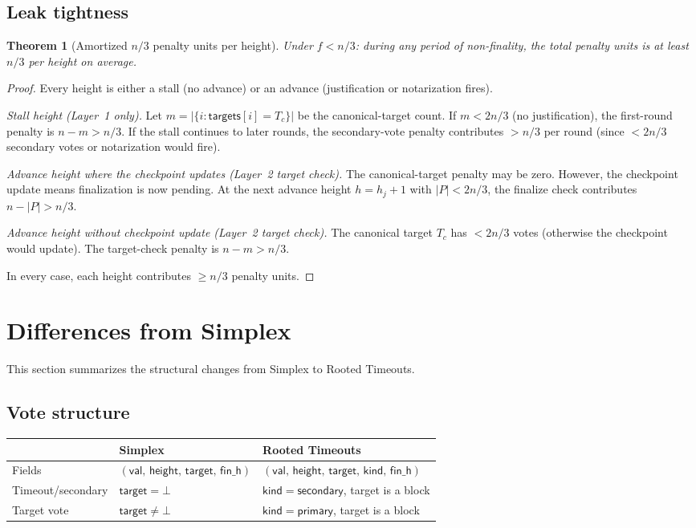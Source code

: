 \ifx\litemode\undefined\documentclass{article}\fi
\theoremstyle{plain}
\newtheorem{theorem}{Theorem}
\theoremstyle{definition}
\theoremstyle{remark}
\begin{document}
\subsection{Leak tightness}

\begin{theorem}[Amortized $n/3$ penalty units per height]\label{thm:tightness}
Under $f < n/3$: during any period of non-finality, the total penalty units is at least $n/3$ per height on average.
\end{theorem}

\begin{proof}
Every height is either a stall (no advance) or an advance (justification or notarization fires).

\emph{Stall height (Layer~1 only).}
Let $m = |\{i : \mathsf{targets}[i] = T_c\}|$ be the canonical-target count.
If $m < 2n/3$ (no justification), the first-round penalty is $n - m > n/3$.
If the stall continues to later rounds, the secondary-vote penalty contributes $> n/3$ per round (since $< 2n/3$ secondary votes or notarization would fire).

\emph{Advance height where the checkpoint updates (Layer~2 target check).}
The canonical-target penalty may be zero.
However, the checkpoint update means finalization is now pending.
At the next advance height $h = h_j + 1$ with $|P| < 2n/3$, the finalize check contributes $n - |P| > n/3$.

\emph{Advance height without checkpoint update (Layer~2 target check).}
The canonical target $T_c$ has $< 2n/3$ votes (otherwise the checkpoint would update).
The target-check penalty is $n - m > n/3$.

In every case, each height contributes $\geq n/3$ penalty units.
\end{proof}

\appendix
\section{Differences from Simplex}\label{app:diffs}

This section summarizes the structural changes from Simplex to Rooted Timeouts.

\subsection*{Vote structure}

\begin{center}
\begin{tabularx}{\textwidth}{lXX}
\toprule
& \textbf{Simplex} & \textbf{Rooted Timeouts} \\
\midrule
Fields & $(\mathsf{val},\, \mathsf{height},\, \mathsf{target},\, \mathsf{fin\_h})$ & $(\mathsf{val},\, \mathsf{height},\, \mathsf{target},\, \mathsf{kind},\, \mathsf{fin\_h})$ \\
Timeout/secondary & $\mathsf{target} = \bot$ & $\mathsf{kind} = \mathsf{secondary}$, target is a block \\
Target vote & $\mathsf{target} \neq \bot$ & $\mathsf{kind} = \mathsf{primary}$, target is a block \\
\bottomrule
\end{tabularx}
\end{center}
\end{document}
